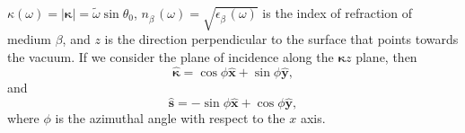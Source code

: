 \documentclass[aps,pra,10pt,amsmath,notitlepage,letterpaper]{revtex4-1}
\begin{document}
$\kappa(\omega)=\vert\boldsymbol{\kappa}\vert = \tilde{\omega}\sin\theta_{0}$,
$n^{\phantom{A}}_{\beta}(\omega)=\sqrt{\epsilon^{\phantom{A}}_{\beta}(\omega)}$
is the index of refraction of medium $\beta$, and $z$ is the direction
perpendicular to the surface that points towards the vacuum. If we consider the
plane of incidence along the $\boldsymbol{\kappa}z$ plane, then
\begin{equation}\label{eq:mc1}
\hat{\boldsymbol{\kappa}} = \cos\phi\hat{\mathbf{x}} + \sin\phi\hat{\mathbf{y}},
\end{equation}
and
\begin{equation}\label{eq:mmc2}
\hat{\mathbf{s}} = -\sin\phi\hat{\mathbf{x}} + \cos\phi\hat{\mathbf{y}},
\end{equation}
where $\phi$ is the azimuthal angle with respect to the $x$ axis.
\end{document}
